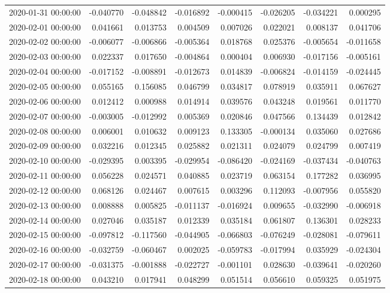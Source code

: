 \begin{tabular}{lrrrrrrr}
2020-01-31 00:00:00 & -0.040770 & -0.048842 & -0.016892 & -0.000415 & -0.026205 & -0.034221 & 0.000295 \\
2020-02-01 00:00:00 & 0.041661 & 0.013753 & 0.004509 & 0.007026 & 0.022021 & 0.008137 & 0.041706 \\
2020-02-02 00:00:00 & -0.006077 & -0.006866 & -0.005364 & 0.018768 & 0.025376 & -0.005654 & -0.011658 \\
2020-02-03 00:00:00 & 0.022337 & 0.017650 & -0.004864 & 0.000404 & 0.006930 & -0.017156 & -0.005161 \\
2020-02-04 00:00:00 & -0.017152 & -0.008891 & -0.012673 & 0.014839 & -0.006824 & -0.014159 & -0.024445 \\
2020-02-05 00:00:00 & 0.055165 & 0.156085 & 0.046799 & 0.034817 & 0.078919 & 0.035911 & 0.067627 \\
2020-02-06 00:00:00 & 0.012412 & 0.000988 & 0.014914 & 0.039576 & 0.043248 & 0.019561 & 0.011770 \\
2020-02-07 00:00:00 & -0.003005 & -0.012992 & 0.005369 & 0.020846 & 0.047566 & 0.134439 & 0.012842 \\
2020-02-08 00:00:00 & 0.006001 & 0.010632 & 0.009123 & 0.133305 & -0.000134 & 0.035060 & 0.027686 \\
2020-02-09 00:00:00 & 0.032216 & 0.012345 & 0.025882 & 0.021311 & 0.024079 & 0.024799 & 0.007419 \\
2020-02-10 00:00:00 & -0.029395 & 0.003395 & -0.029954 & -0.086420 & -0.024169 & -0.037434 & -0.040763 \\
2020-02-11 00:00:00 & 0.056228 & 0.024571 & 0.040885 & 0.023719 & 0.063154 & 0.177282 & 0.036995 \\
2020-02-12 00:00:00 & 0.068126 & 0.024467 & 0.007615 & 0.003296 & 0.112093 & -0.007956 & 0.055820 \\
2020-02-13 00:00:00 & 0.008888 & 0.005825 & -0.011137 & -0.016924 & 0.009655 & -0.032990 & -0.006918 \\
2020-02-14 00:00:00 & 0.027046 & 0.035187 & 0.012339 & 0.035184 & 0.061807 & 0.136301 & 0.028233 \\
2020-02-15 00:00:00 & -0.097812 & -0.117560 & -0.044905 & -0.066803 & -0.076249 & -0.028081 & -0.079611 \\
2020-02-16 00:00:00 & -0.032759 & -0.060467 & 0.002025 & -0.059783 & -0.017994 & 0.035929 & -0.024304 \\
2020-02-17 00:00:00 & -0.031375 & -0.001888 & -0.022727 & -0.001101 & 0.028630 & -0.039641 & -0.020260 \\
2020-02-18 00:00:00 & 0.043210 & 0.017941 & 0.048299 & 0.051514 & 0.056610 & 0.059325 & 0.051975 \\

\end{tabular}
